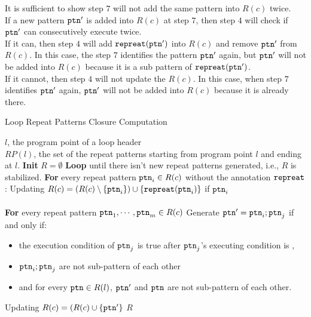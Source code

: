 \begin{enumerate}
It is sufficient to show step $7$ will not add the same pattern into $R(c)$ twice.
\\
If a new pattern $\mathtt{ptn}'$ is added into $R(c)$ at step $7$, 
then step $4$ will check if $\mathtt{ptn}'$ can consecutively execute twice.
\\
If it can, then step $4$ will add $\mathtt{repreat}(\mathtt{ptn}')$ into $R(c)$ and remove $\mathtt{ptn}'$ from $R(c)$.
In this case, the step $7$ identifies the pattern $\mathtt{ptn}'$ again, but $\mathtt{ptn}'$ will not be added into $R(c)$ because
it is a sub pattern of $\mathtt{repreat}(\mathtt{ptn}')$.
\\
If it cannot, then step $4$ will not update the $R(c)$. 
In this case, when step $7$ identifies $\mathtt{ptn}'$ again, $\mathtt{ptn}'$ will not be added into $R(c)$ because
it is already there.
\end{enumerate}
%
\begin{algorithm}
\caption{
{Loop Repeat Patterns Closure Computation}
\label{alg:loop-repeat-pattern}
}
\begin{algorithmic}[1]
\REQUIRE $l$, the program point of a loop header
\\ \quad
$RP(l)$, the set of the repeat patterns starting from program point $l$ and ending at $l$.
\STATE  \textbf{Init} $R = \emptyset$
\STATE  \textbf{Loop} until there isn't new repeat patterns generated, i.e., $R$ is stabilized.
\STATE  \quad \textbf{For} every repeat pattern $\mathtt{ptn}_i \in R(c)$ without the annotation $\mathtt{repreat}$:
\STATE  \quad \quad Updating $R(c) = (R(c) \setminus \{\mathtt{ptn}_{i}\}) \cup \{\mathtt{repreat}(\mathtt{ptn}_i)\}$
if $\mathtt{ptn}_i$ 
\\ \quad \quad {}
\\ \quad \quad 
{}
\STATE  \quad \textbf{For} every repeat pattern $\mathtt{ptn}_1, \cdots, \mathtt{ptn}_m \in R(c)$
\STATE \quad \quad  Generate $\mathtt{ptn}' = \mathtt{ptn}_{i}; \mathtt{ptn}_{j} $ 
if and only if:
\begin{itemize}
  \item  the execution condition of $\mathtt{ptn}_{j}$
is true after $\mathtt{ptn}_{j}$'s executing condition is , 
\item   $\mathtt{ptn}_{i}; \mathtt{ptn}_{j}$ are not sub-pattern of each other
\item  and for every $\mathtt{ptn} \in R(l)$, $\mathtt{ptn}'$ and $\mathtt{ptn}$ are not sub-pattern of each other.
\end{itemize}
\STATE  \quad \quad Updating $R(c) = (R(c) \cup \{\mathtt{ptn}'\}$
\RETURN $R$
\end{algorithmic}
\end{algorithm}
